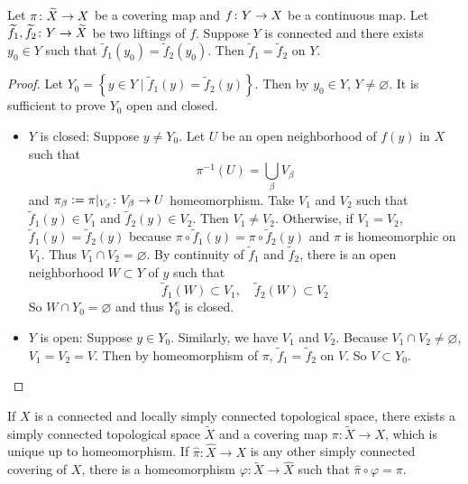 \begin{enumerate}[label=\arabic{*}.]
	\begin{prop}
		Let $\pi \colon \widetilde{X} \rightarrow X$ be a covering map and $f \colon Y \rightarrow X$ be a continuous map. Let $\widetilde{f}_1,\widetilde{f}_2 \colon Y \rightarrow \widetilde{X}$ be two liftings of $f$. Suppose $Y$ is connected and there exists $y_0 \in Y$ such that $\widetilde{f}_1\left(y_0\right)=\widetilde{f}_2\left(y_0\right)$. Then $\widetilde{f}_1=\widetilde{f}_2$ on $Y$.
	\end{prop}
	\begin{proof}
		Let $Y_0=\left\{y \in Y \mid \tilde{f}_1(y)=\tilde{f}_2(y)\right\}$. Then by $y_0 \in Y$, $Y \neq \varnothing$. It is sufficient to prove $Y_0$ open and closed.
		\begin{itemize}
			\item $Y$ is closed: Suppose $y \neq Y_0$. Let $U$ be an open neighborhood of $f(y)$ in $X$ such that
			\begin{equation*}
				\pi^{-1}(U)=\bigcup_\beta V_\beta
			\end{equation*}
			and $\pi_\beta \vcentcolon= \pi|_{V_\beta} \colon V_\beta \rightarrow U$ homeomorphism. Take $V_1$ and $V_2$ such that $\widetilde{f}_1(y) \in V_1$ and $\widetilde{f}_2(y) \in V_2$. Then $V_1 \neq V_2$. Otherwise, if $V_1 = V_2$, $\widetilde{f}_1(y) = \widetilde{f}_2(y)$ because $\pi \circ \widetilde{f}_1(y) = \pi \circ \widetilde{f}_2(y)$ and $\pi$ is homeomorphic on $V_1$. Thus $V_1 \cap V_2 = \varnothing$. By continuity of $\widetilde{f}_1$ and $\widetilde{f}_2$, there is an open neighborhood $W \subset Y$ of $y$ such that
			\begin{equation*}
				\widetilde{f}_1(W) \subset V_1,\quad \widetilde{f}_2(W) \subset V_2
			\end{equation*}
			So $W \cap Y_0 = \varnothing$ and thus $Y_0^c$ is closed.

			\item $Y$ is open: Suppose $y \in Y_0$. Similarly, we have $V_1$ and $V_2$. Because $V_1 \cap V_2 \neq \varnothing$, $V_1 = V_2 = V$. Then by homeomorphism of $\pi$, $\widetilde{f}_1 = \widetilde{f}_2$ on $V$. So $V\subset Y_0$. \qedhere
		\end{itemize}
	\end{proof}

	\begin{thm}
		If $X$ is a connected and locally simply connected topological space, there exists a simply connected topological space $\tilde{X}$ and a covering map $\pi: \tilde{X} \rightarrow X$, which is unique up to homeomorphism. If $\hat{\pi}: \hat{X} \rightarrow X$ is any other simply connected covering of $X$, there is a homeomorphism $\varphi: \widetilde{X} \rightarrow \hat{X}$ such that $\hat{\pi} \circ \varphi=\pi$.
	\end{thm}


\end{enumerate}
